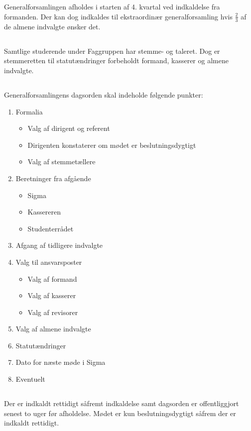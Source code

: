 \documentclass[danish,a4paper,twocolumn]{article}
\newcommand{\foreningen}{Sigma}
\begin{document}
\subsection{}Generalforsamlingen afholdes i starten af 4. kvartal ved indkaldelse fra formanden. Der kan dog indkaldes til ekstraordinær generalforsamling hvis $\frac{2}{3}$ af de almene indvalgte ønsker det.
\subsection{}Samtlige studerende under Faggruppen har stemme- og taleret. Dog er stemmeretten til statutændringer forbeholdt formand, kasserer og almene indvalgte.
\subsection{}Generalforsamlingens dagsorden skal indeholde følgende punkter:
\begin{enumerate}
\item Formalia
  \begin{itemize}
  \item Valg af dirigent og referent
  \item Dirigenten konstaterer om mødet er beslutningsdygtigt
  \item Valg af stemmetællere
  \end{itemize}
\item Beretninger fra afgående
  \begin{itemize}
  \item \foreningen
  \item Kassereren
  \item Studenterrådet
  \end{itemize}
\item Afgang af tidligere indvalgte
\item Valg til ansvarsposter
  \begin{itemize}
      \item Valg af formand
      \item Valg af kasserer
      \item Valg af revisorer
  \end{itemize}
\item Valg af almene indvalgte
\item Statutændringer
\item Dato for næste møde i \foreningen
\item Eventuelt
\end{enumerate}
\subsection{}Der er indkaldt rettidigt såfremt indkaldelse samt dagsorden er offentliggjort senest to uger før afholdelse. Mødet er kun beslutningsdygtigt såfrem der er indkaldt rettidigt.
\end{document}
